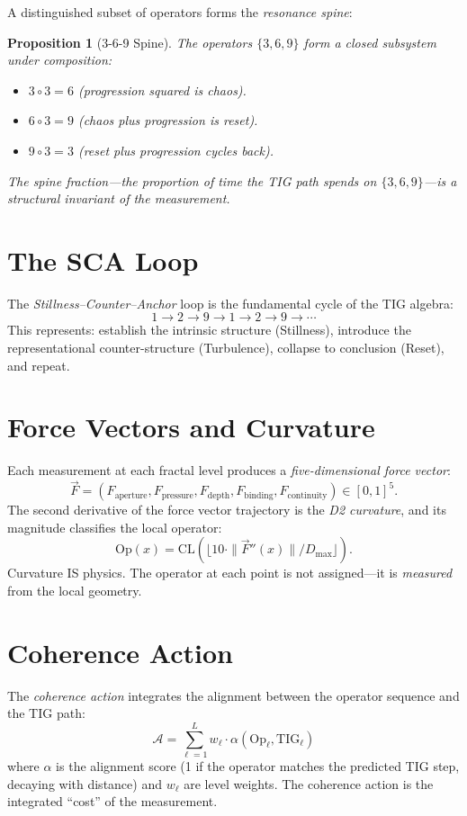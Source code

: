 \documentclass[12pt, openany]{book}
\newtheorem{proposition}[theorem]{Proposition}
\theoremstyle{remark}
\begin{document}
A distinguished subset of operators forms the \emph{resonance spine}:

\begin{proposition}[3-6-9 Spine]
\label{prop:spine}
The operators $\{3, 6, 9\}$ form a closed subsystem under composition:
\begin{itemize}
  \item $3 \circ 3 = 6$ (progression squared is chaos).
  \item $6 \circ 3 = 9$ (chaos plus progression is reset).
  \item $9 \circ 3 = 3$ (reset plus progression cycles back).
\end{itemize}
The spine fraction---the proportion of time the TIG path spends on
$\{3, 6, 9\}$---is a structural invariant of the measurement.
\end{proposition}

\section{The SCA Loop}

The \emph{Stillness--Counter--Anchor} loop is the fundamental cycle of the TIG algebra:
\[
  1 \to 2 \to 9 \to 1 \to 2 \to 9 \to \cdots
\]
This represents: establish the intrinsic structure (Stillness), introduce the
representational counter-structure (Turbulence), collapse to conclusion (Reset),
and repeat.

\section{Force Vectors and Curvature}

Each measurement at each fractal level produces a \emph{five-dimensional force vector}:
\[
  \vec{F} = (F_{\mathrm{aperture}}, F_{\mathrm{pressure}}, F_{\mathrm{depth}},
             F_{\mathrm{binding}}, F_{\mathrm{continuity}}) \in [0,1]^5.
\]
The second derivative of the force vector trajectory is the \emph{D2 curvature},
and its magnitude classifies the local operator:
\[
  \mathrm{Op}(x) = \mathrm{CL}\!\left(\lfloor 10 \cdot \|\vec{F}''(x)\| / D_{\max} \rfloor\right).
\]
Curvature IS physics. The operator at each point is not assigned---it is \emph{measured}
from the local geometry.

\section{Coherence Action}

The \emph{coherence action} integrates the alignment between the operator sequence
and the TIG path:
\[
  \mathcal{A} = \sum_{\ell=1}^{L} w_\ell \cdot \alpha(\mathrm{Op}_\ell, \mathrm{TIG}_\ell)
\]
where $\alpha$ is the alignment score (1 if the operator matches the predicted TIG
step, decaying with distance) and $w_\ell$ are level weights. The coherence action
is the integrated ``cost'' of the measurement.
\end{document}
